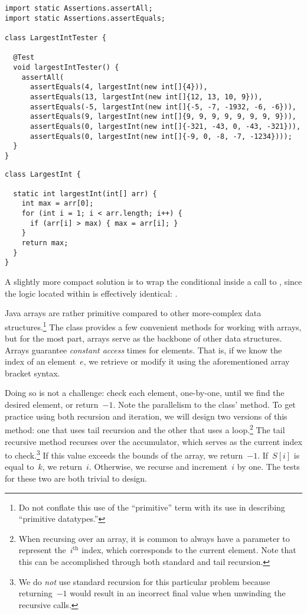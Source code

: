 \begin{lstlisting}[language=MyJava]
import static Assertions.assertAll;
import static Assertions.assertEquals;

class LargestIntTester {

  @Test
  void largestIntTester() {
    assertAll(
      assertEquals(4, largestInt(new int[]{4})), 
      assertEquals(13, largestInt(new int[]{12, 13, 10, 9})), 
      assertEquals(-5, largestInt(new int[]{-5, -7, -1932, -6, -6})), 
      assertEquals(9, largestInt(new int[]{9, 9, 9, 9, 9, 9, 9, 9})), 
      assertEquals(0, largestInt(new int[]{-321, -43, 0, -43, -321})), 
      assertEquals(0, largestInt(new int[]{-9, 0, -8, -7, -1234})));
  }
}
\end{lstlisting}

\begin{lstlisting}[language=MyJava]
class LargestInt {

  static int largestInt(int[] arr) {
    int max = arr[0];
    for (int i = 1; i < arr.length; i++) {
      if (arr[i] > max) { max = arr[i]; }
    }
    return max;
  }
}
\end{lstlisting}

A slightly more compact solution is to wrap the conditional inside a call to , since the logic located within is effectively identical: .

Java arrays are rather primitive compared to other more-complex data structures.\footnote{Do not conflate this use of the ``primitive'' term with its use in describing ``primitive datatypes.''} 
The  class provides a few convenient methods for working with arrays, but for the most part, arrays serve as the backbone of other data structures. 
Arrays guarantee \emph{constant access} times for elements. 
That is, if we know the index of an element~$e$, we retrieve or modify it using the aforementioned array bracket syntax. 

Doing so is not a challenge: check each element, one-by-one, until we find the desired element, or return~$-1$. 
Note the parallelism to the  class'  method.
To get practice using both recursion and iteration, we will design two versions of this method: one that uses tail recursion and the other that uses a loop.\footnote{When recursing over an array, it is common to always have a parameter to represent the~$i^\text{th}$ index, which corresponds to the current element. Note that this can be accomplished through both standard and tail recursion.} 
The tail recursive method recurses over the accumulator, which serves as the current index to check.\footnote{We do \emph{not} use standard recursion for this particular problem because returning~$-1$ would result in an incorrect final value when unwinding the recursive calls.} 
If this value exceeds the bounds of the array, we return~$-1$. 
If~$S[i]$ is equal to~$k$, we return~$i$. 
Otherwise, we recurse and increment~$i$ by one. 
The tests for these two are both trivial to design.

